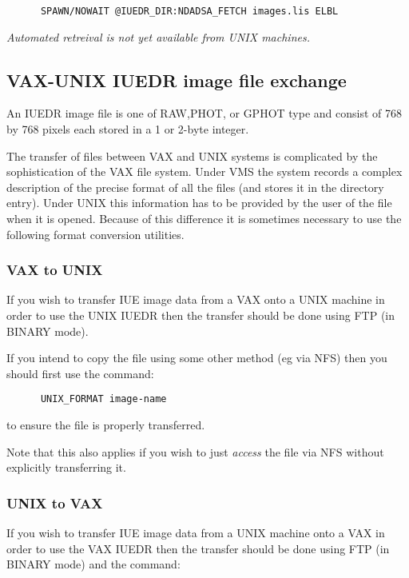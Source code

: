 \begin{verbatim}
      SPAWN/NOWAIT @IUEDR_DIR:NDADSA_FETCH images.lis ELBL
\end{verbatim}

{\em Automated retreival is not yet available from UNIX machines.}

\subsection{VAX-UNIX IUEDR image file exchange}

An IUEDR image file is one of RAW,PHOT, or GPHOT type and consist of
768 by 768 pixels each stored in a 1 or 2-byte integer.

The transfer of files between VAX and UNIX systems is complicated by
the sophistication of the VAX file system. Under VMS the system
records a complex description of the precise format of all the  files
(and stores it in  the directory entry). Under UNIX this information
has to be provided by the user of the file when it is  opened. Because
of this difference it is sometimes necessary to use the following
format conversion utilities.

\subsubsection{VAX to UNIX}

If you wish to transfer IUE image data from a VAX onto a UNIX machine
in order to use the UNIX IUEDR then the transfer should be done using
FTP (in BINARY mode).

If you intend to copy the file using some other method (eg via NFS)
then you should first use the command:

\begin{verbatim}
      UNIX_FORMAT image-name
\end{verbatim}

to ensure the file is properly transferred.

Note that this also applies if you wish to just {\em access} the file
via NFS without explicitly transferring it.

\subsubsection{UNIX to VAX}

If you wish to transfer IUE image data from a UNIX machine onto a VAX
in order to use the VAX IUEDR then the transfer should be done using
FTP (in BINARY mode) and the command:

